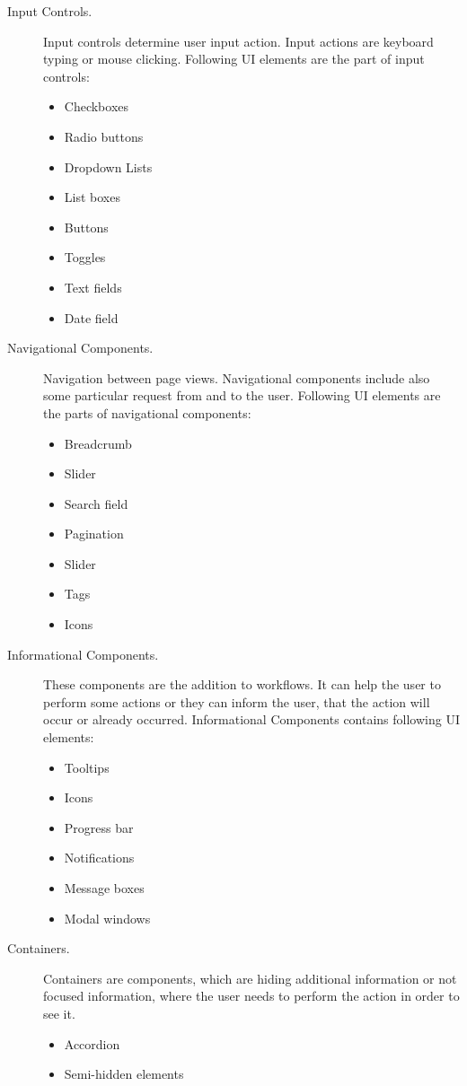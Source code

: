 \begin{description}
\item[Input Controls.] Input controls determine user input action. Input actions are keyboard typing or mouse clicking.  Following UI elements are the part of input controls: 
\begin{itemize}
\item Checkboxes
\item Radio buttons 
\item Dropdown Lists
\item List boxes
\item Buttons
\item Toggles
\item Text fields
\item Date field
\end{itemize}
\item[Navigational Components.] Navigation between page views. Navigational components include also some particular request from and to the user. Following UI elements are the parts of navigational components:
\begin{itemize}
\item Breadcrumb 
\item Slider
\item Search field
\item Pagination
\item Slider
\item Tags
\item Icons
\end{itemize}
\item[Informational Components.] These components are the addition to workflows. It can help the user to perform some actions or they can inform the user, that the action will occur or already occurred. Informational Components contains following UI elements:
\begin{itemize}
\item Tooltips
\item Icons
\item Progress bar
\item Notifications
\item Message boxes
\item Modal windows
\end{itemize}
\item[Containers.] Containers are components, which are hiding additional information or not focused information, where the user needs to perform the action in order to see it.   
\begin{itemize}
\item Accordion
\item Semi-hidden elements
\end{itemize}
\end{description}


